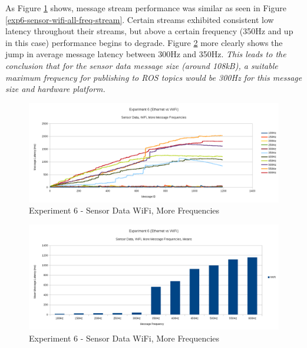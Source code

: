 \documentclass[../dissertation.tex]{subfiles}
\begin{document}
As Figure \ref{exp6-sensor-wifi-more-freq-stream} shows, message stream performance was similar as seen in Figure \ref{exp6-sensor-wifi-all-freq-stream}. Certain streams exhibited consistent low latency throughout their streams, but above a certain frequency (350Hz and up in this case) performance begins to degrade. Figure \ref{exp6-sensor-wifi-more-freq-means} more clearly shows the jump in average message latency between 300Hz and 350Hz. \textit{This leads to the conclusion that for the sensor data message size (around 108kB), a suitable maximum frequency for publishing to ROS topics would be 300Hz for this message size and hardware platform.}

\begin{figure}[H]
\centering
\includegraphics[width=\textwidth]{images/experiment6/sensor_data_wifi_more_freqs_stream.png}
\caption{Experiment 6 - Sensor Data WiFi, More Frequencies}
\label{exp6-sensor-wifi-more-freq-stream}
\end{figure}

\begin{figure}[H]
\centering
\includegraphics[width=\textwidth]{images/experiment6/sensor_data_wifi_more_freqs_means.png}
\caption{Experiment 6 - Sensor Data WiFi, More Frequencies}
\label{exp6-sensor-wifi-more-freq-means}
\end{figure}
\end{document}
